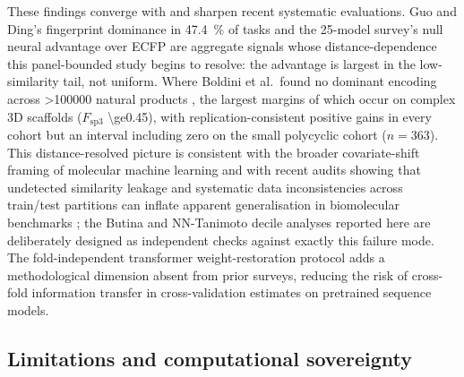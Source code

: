 \documentclass[11pt,a4paper]{article}
\begin{document}
These findings converge with and sharpen recent systematic evaluations. Guo and Ding's fingerprint dominance in \qty{47.4}{\percent} of tasks \citep{guo_ding_2026} and the 25-model survey's null neural advantage over ECFP \citep{benchmark_pretrained_2025} are aggregate signals whose distance-dependence this panel-bounded study begins to resolve: the advantage is largest in the low-similarity tail, not uniform. Where Boldini et al.\ found no dominant encoding across \num{>100000} natural products \citep{boldini2024}, the largest margins of which occur on complex 3D scaffolds ($F_{\mathrm{sp3}}$ \num{\ge0.45}), with replication-consistent positive gains in every cohort but an interval including zero on the small polycyclic cohort ($n=\num{363}$). This distance-resolved picture is consistent with the broader covariate-shift framing of molecular machine learning \citep{klarner2023covariate} and with recent audits showing that undetected similarity leakage and systematic data inconsistencies across train/test partitions can inflate apparent generalisation in biomolecular benchmarks \citep{joeres2025datasail,joeres2026datasailaddendum,schuh2026audit}; the Butina and NN-Tanimoto decile analyses reported here are deliberately designed as independent checks against exactly this failure mode. The fold-independent transformer weight-restoration protocol adds a methodological dimension absent from prior surveys, reducing the risk of cross-fold information transfer in cross-validation estimates on pretrained sequence models.

\subsection{Limitations and computational sovereignty}
\end{document}
